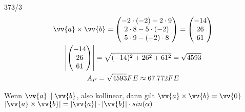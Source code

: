 \begin{exercise}{373/3}
\begin{gather*}
    \vv{a} \times \vv{b} = \begin{pmatrix}-2 \cdot (-2) - 2 \cdot 9 \\ 2 \cdot 8 - 5 \cdot (-2) \\ 5 \cdot 9 - (-2) \cdot 8\end{pmatrix} = \begin{pmatrix}-14 \\ 26 \\ 61\end{pmatrix} \\
    \left|\begin{pmatrix}-14 \\ 26 \\ 61\end{pmatrix}\right| = \sqrt{(-14)^2 + 26^2 + 61^2} = \sqrt{4593} \\
    A_P = \sqrt{4593}FE \approx 67.772FE
  \end{gather*}
\end{exercise}
Wenn $\vv{a} \parallel \vv{b}$, also kollinear, dann gilt $\vv{a} \times \vv{b} = \vv{0}$ \\
$|\vv{a} \times \vv{b}| = |\vv{a}| \cdot |\vv{b}| \cdot sin(\alpha)$
